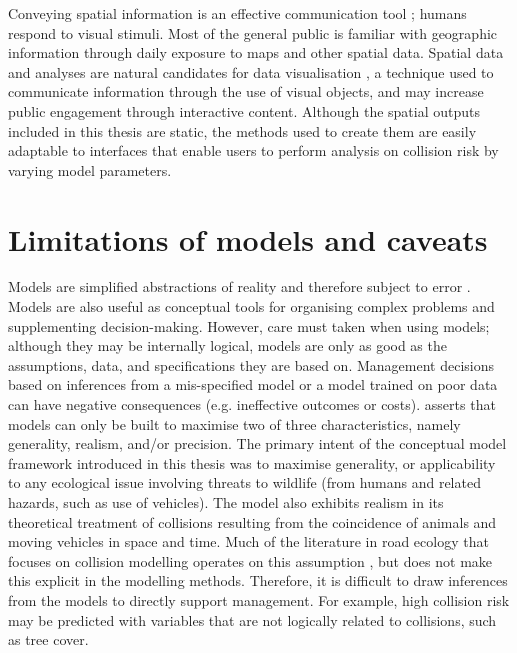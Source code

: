 
Conveying spatial information is an effective communication tool \citep{king00}; humans respond to visual stimuli. Most of the general public is familiar with geographic information through daily exposure to maps and other spatial data. Spatial data and analyses are natural candidates for data visualisation \citep{osul14}, a technique used to communicate information through the use of visual objects, and may increase public engagement through interactive content. Although the spatial outputs included in this thesis are static, the methods used to create them are easily adaptable to interfaces that enable users to perform analysis on collision risk by varying model parameters.

\section{Limitations of models and caveats}

Models are simplified abstractions of reality and therefore subject to error \citep{burg05}. Models are also useful as conceptual tools for organising complex problems and supplementing decision-making. However, care must taken when using models; although they may be internally logical, models are only as good as the assumptions, data, and specifications they are based on. Management decisions based on inferences from a mis-specified model or a model trained on poor data can have negative consequences (e.g. ineffective outcomes or costs). \cite{levi66} asserts that models can only be built to maximise two of three characteristics, namely generality, realism, and/or precision. The primary intent of the conceptual model framework introduced in this thesis was to maximise generality, or applicability to any ecological issue involving threats to wildlife (from humans and related hazards, such as use of vehicles). The model also exhibits realism in its theoretical treatment of collisions resulting from the coincidence of animals and moving vehicles in space and time. Much of the literature in road ecology that focuses on collision modelling operates on this assumption \citep{form03,guns11}, but does not make this explicit in the modelling methods. Therefore, it is difficult to draw inferences from the models to directly support management. For example, high collision risk may be predicted with variables that are not logically related to collisions, such as tree cover. 


